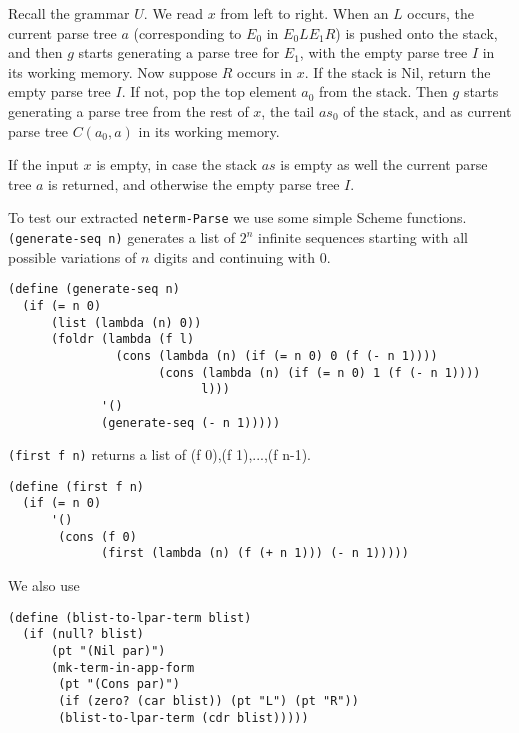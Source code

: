 \documentclass[12pt]{amsart}
\newcommand{\nil}{\mathrm{Nil}}
\newcommand{\as}{\mathit{a}\!\mathit{s}}
\begin{document}
\begin{appendix}
Recall the grammar $U$.  We read $x$ from left to right.  When an $L$
occurs, the current parse tree $a$ (corresponding to $E_0$ in $E_0 L
E_1 R$) is pushed onto the stack, and then $g$ starts generating a
parse tree for $E_1$, with the empty parse tree $I$ in its working
memory.  Now suppose $R$ occurs in $x$.  If the stack is $\nil$,
return the empty parse tree $I$.  If not, pop the top element $a_0$
from the stack.  Then $g$ starts generating a parse tree from the rest
of $x$, the tail $\as_0$ of the stack, and as current parse tree
$C(a_0, a)$ in its working memory.

If the input $x$ is empty, in case the stack $\as$ is empty as well
the current parse tree $a$ is returned, and otherwise the empty parse
tree $I$.

To test our extracted \verb|neterm-Parse| we use some simple Scheme
functions.  \verb|(generate-seq n)| generates a list of $2^n$ infinite
sequences starting with all possible variations of $n$ digits and
continuing with $0$.
\begin{verbatim}
(define (generate-seq n)
  (if (= n 0)
      (list (lambda (n) 0))
      (foldr (lambda (f l)
               (cons (lambda (n) (if (= n 0) 0 (f (- n 1))))
                     (cons (lambda (n) (if (= n 0) 1 (f (- n 1))))
                           l)))
             '()
             (generate-seq (- n 1)))))
\end{verbatim}
\verb|(first f n)| returns a list of (f 0),(f 1),...,(f n-1).
\begin{verbatim}
(define (first f n)
  (if (= n 0)
      '()
       (cons (f 0)
             (first (lambda (n) (f (+ n 1))) (- n 1)))))
\end{verbatim}
We also use
\begin{verbatim}
(define (blist-to-lpar-term blist)
  (if (null? blist)
      (pt "(Nil par)")
      (mk-term-in-app-form
       (pt "(Cons par)")
       (if (zero? (car blist)) (pt "L") (pt "R"))
       (blist-to-lpar-term (cdr blist)))))


\end{verbatim}
\end{appendix}
\end{document}
